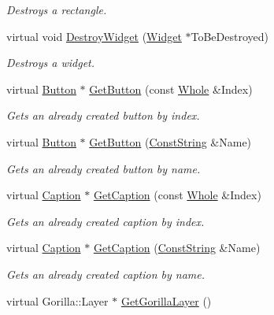 \begin{DoxyCompactItemize}
\begin{DoxyCompactList}\small\item\em Destroys a rectangle. \item\end{DoxyCompactList}\item 
virtual void \hyperlink{classphys_1_1UI_1_1Layer_a472de1771d8e80232292ec6a19c871a6}{DestroyWidget} (\hyperlink{classphys_1_1UI_1_1Widget}{Widget} $\ast$ToBeDestroyed)
\begin{DoxyCompactList}\small\item\em Destroys a widget. \item\end{DoxyCompactList}\item 
virtual \hyperlink{classphys_1_1UI_1_1Button}{Button} $\ast$ \hyperlink{classphys_1_1UI_1_1Layer_a96d3a5d016d435878c0184d02c839089}{GetButton} (const \hyperlink{namespacephys_a460f6bc24c8dd347b05e0366ae34f34a}{Whole} \&Index)
\begin{DoxyCompactList}\small\item\em Gets an already created button by index. \item\end{DoxyCompactList}\item 
virtual \hyperlink{classphys_1_1UI_1_1Button}{Button} $\ast$ \hyperlink{classphys_1_1UI_1_1Layer_a6331e3e7a049deba36aba957d0dcecd8}{GetButton} (\hyperlink{namespacephys_a5ce5049f8b4bf88d6413c47b504ebb31}{ConstString} \&Name)
\begin{DoxyCompactList}\small\item\em Gets an already created button by name. \item\end{DoxyCompactList}\item 
virtual \hyperlink{classphys_1_1UI_1_1Caption}{Caption} $\ast$ \hyperlink{classphys_1_1UI_1_1Layer_a78334cb4e75aaa559bfb76af31e2d0e0}{GetCaption} (const \hyperlink{namespacephys_a460f6bc24c8dd347b05e0366ae34f34a}{Whole} \&Index)
\begin{DoxyCompactList}\small\item\em Gets an already created caption by index. \item\end{DoxyCompactList}\item 
virtual \hyperlink{classphys_1_1UI_1_1Caption}{Caption} $\ast$ \hyperlink{classphys_1_1UI_1_1Layer_af2dd8dc0a5b8775f069b98ce36ce9af6}{GetCaption} (\hyperlink{namespacephys_a5ce5049f8b4bf88d6413c47b504ebb31}{ConstString} \&Name)
\begin{DoxyCompactList}\small\item\em Gets an already created caption by name. \item\end{DoxyCompactList}\item 
\hypertarget{classphys_1_1UI_1_1Layer_a6528081453b4f2be4d7a4ad8878edbf0}{
virtual Gorilla::Layer $\ast$ \hyperlink{classphys_1_1UI_1_1Layer_a6528081453b4f2be4d7a4ad8878edbf0}{GetGorillaLayer} ()}
\label{classphys_1_1UI_1_1Layer_a6528081453b4f2be4d7a4ad8878edbf0}


\end{DoxyCompactItemize}
